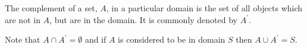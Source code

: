 The complement of a set, $A$, in a particular domain is the set of all objects which are not in $A$, but are in the domain. It is commonly denoted by $A^\prime$.
\par
Note that $A \cap A^\prime = \emptyset$ and if $A$ is considered to be in domain $S$ then $A \cup A^\prime = S.$
